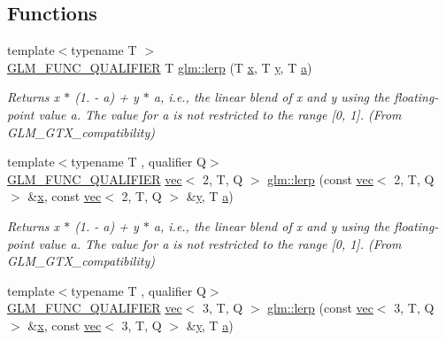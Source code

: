 \subsection*{Functions}
\begin{DoxyCompactItemize}
\item 
{\footnotesize template$<$typename T $>$ }\\\mbox{\hyperlink{setup_8hpp_a33fdea6f91c5f834105f7415e2a64407}{G\+L\+M\+\_\+\+F\+U\+N\+C\+\_\+\+Q\+U\+A\+L\+I\+F\+I\+ER}} T \mbox{\hyperlink{group__gtx__compatibility_ga5494ba3a95ea6594c86fc75236886864}{glm\+::lerp}} (T \mbox{\hyperlink{_s_d_l__opengl_8h_ad0e63d0edcdbd3d79554076bf309fd47}{x}}, T \mbox{\hyperlink{_s_d_l__opengl_8h_a1675d9d7bb68e1657ff028643b4037e3}{y}}, T \mbox{\hyperlink{_s_d_l__opengl__glext_8h_a3309789fc188587d666cda5ece79cf82}{a}})
\begin{DoxyCompactList}\small\item\em Returns x $\ast$ (1. -\/ a) + y $\ast$ a, i.\+e., the linear blend of x and y using the floating-\/point value a. The value for a is not restricted to the range \mbox{[}0, 1\mbox{]}. (From G\+L\+M\+\_\+\+G\+T\+X\+\_\+compatibility) \end{DoxyCompactList}\item 
{\footnotesize template$<$typename T , qualifier Q$>$ }\\\mbox{\hyperlink{setup_8hpp_a33fdea6f91c5f834105f7415e2a64407}{G\+L\+M\+\_\+\+F\+U\+N\+C\+\_\+\+Q\+U\+A\+L\+I\+F\+I\+ER}} \mbox{\hyperlink{structglm_1_1vec}{vec}}$<$ 2, T, Q $>$ \mbox{\hyperlink{group__gtx__compatibility_gaa551c0a0e16d2d4608e49f7696df897f}{glm\+::lerp}} (const \mbox{\hyperlink{structglm_1_1vec}{vec}}$<$ 2, T, Q $>$ \&\mbox{\hyperlink{_s_d_l__opengl_8h_ad0e63d0edcdbd3d79554076bf309fd47}{x}}, const \mbox{\hyperlink{structglm_1_1vec}{vec}}$<$ 2, T, Q $>$ \&\mbox{\hyperlink{_s_d_l__opengl_8h_a1675d9d7bb68e1657ff028643b4037e3}{y}}, T \mbox{\hyperlink{_s_d_l__opengl__glext_8h_a3309789fc188587d666cda5ece79cf82}{a}})
\begin{DoxyCompactList}\small\item\em Returns x $\ast$ (1. -\/ a) + y $\ast$ a, i.\+e., the linear blend of x and y using the floating-\/point value a. The value for a is not restricted to the range \mbox{[}0, 1\mbox{]}. (From G\+L\+M\+\_\+\+G\+T\+X\+\_\+compatibility) \end{DoxyCompactList}\item 
{\footnotesize template$<$typename T , qualifier Q$>$ }\\\mbox{\hyperlink{setup_8hpp_a33fdea6f91c5f834105f7415e2a64407}{G\+L\+M\+\_\+\+F\+U\+N\+C\+\_\+\+Q\+U\+A\+L\+I\+F\+I\+ER}} \mbox{\hyperlink{structglm_1_1vec}{vec}}$<$ 3, T, Q $>$ \mbox{\hyperlink{group__gtx__compatibility_ga44a8b5fd776320f1713413dec959b32a}{glm\+::lerp}} (const \mbox{\hyperlink{structglm_1_1vec}{vec}}$<$ 3, T, Q $>$ \&\mbox{\hyperlink{_s_d_l__opengl_8h_ad0e63d0edcdbd3d79554076bf309fd47}{x}}, const \mbox{\hyperlink{structglm_1_1vec}{vec}}$<$ 3, T, Q $>$ \&\mbox{\hyperlink{_s_d_l__opengl_8h_a1675d9d7bb68e1657ff028643b4037e3}{y}}, T \mbox{\hyperlink{_s_d_l__opengl__glext_8h_a3309789fc188587d666cda5ece79cf82}{a}})

\end{DoxyCompactItemize}
